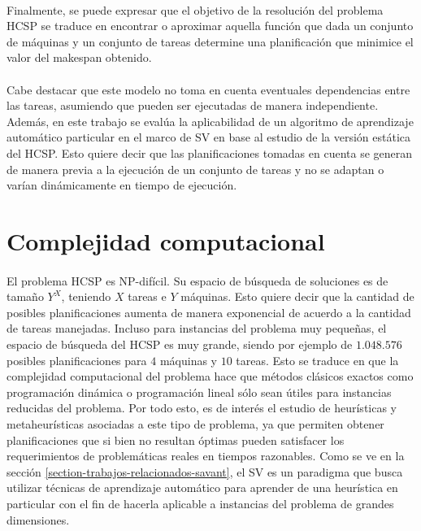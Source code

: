 \paragraph{}Finalmente, se puede expresar que el objetivo de la resolución del problema HCSP se traduce en encontrar o aproximar aquella función que dada un conjunto de máquinas y un conjunto de tareas determine una planificación que minimice el valor del makespan obtenido.

\paragraph{}Cabe destacar que este modelo no toma en cuenta eventuales dependencias entre las tareas, asumiendo que pueden ser ejecutadas de manera independiente. Además, en este trabajo se evalúa la aplicabilidad de un algoritmo de aprendizaje automático particular en el marco de SV en base al estudio de la versión estática del HCSP. Esto quiere decir que las planificaciones tomadas en cuenta se generan de manera previa a la ejecución de un conjunto de tareas y no se adaptan o varían dinámicamente en tiempo de ejecución.

\section{Complejidad computacional} \label{section:descripcion-problema,subsection:complejidad-computacional}

\paragraph{}El problema HCSP es NP-difícil. Su espacio de búsqueda de soluciones es de tamaño $Y^X$, teniendo $X$ tareas e $Y$ máquinas. Esto quiere decir que la cantidad de posibles planificaciones aumenta de manera exponencial de acuerdo a la cantidad de tareas manejadas. Incluso para instancias del problema muy pequeñas, el espacio de búsqueda del HCSP es muy grande, siendo por ejemplo de $1.048.576$ posibles planificaciones para $4$ máquinas y $10$ tareas. Esto se traduce en que la complejidad computacional del problema hace que métodos clásicos exactos como programación dinámica o programación lineal sólo sean útiles para instancias reducidas del problema. Por todo esto, es de interés el estudio de heurísticas y metaheurísticas asociadas a este tipo de problema, ya que permiten obtener planificaciones que si bien no resultan óptimas pueden satisfacer los requerimientos de problemáticas reales en tiempos razonables.
Como se ve en la sección \ref{section-trabajos-relacionados-savant}, el SV es un paradigma que busca utilizar técnicas de aprendizaje automático para aprender de una heurística en particular con el fin de hacerla aplicable a instancias del problema de grandes dimensiones.


